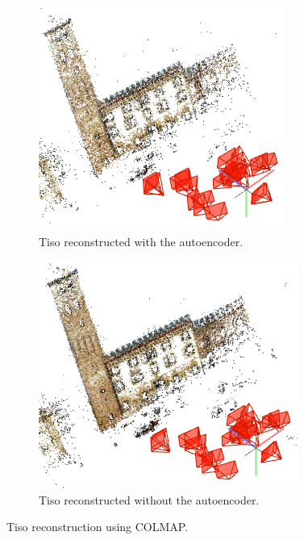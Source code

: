 \begin{figure}[H]
     \centering
          \begin{subfigure}[b]{0.48\textwidth}
		\centering
    		\includegraphics[width=\textwidth]{images/tisoautoenc.png}
		\caption{\centering Tiso reconstructed with the autoencoder.}
		\label{fig:tisoautoenc}   
     \end{subfigure}
     \hfill
     \begin{subfigure}[b]{.48\textwidth}
		\centering
		\includegraphics[width=\textwidth]{images/tisotrue.png}  
		\caption{\centering Tiso reconstructed without the autoencoder.}
	    	\label{fig:tisotrue} 
     \end{subfigure}
        \caption{Tiso reconstruction using COLMAP.}
        \label{fig:Tiso3D}
\end{figure}

